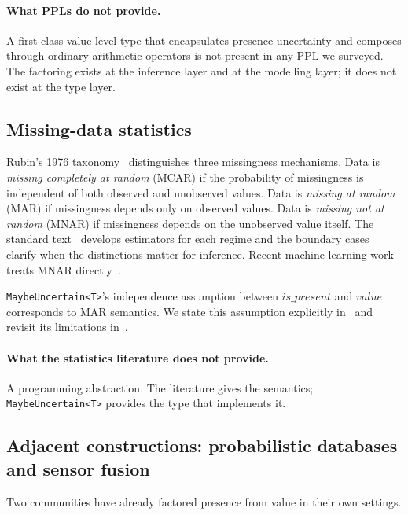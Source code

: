 \paragraph{What PPLs do not provide.} A first-class value-level type that
encapsulates presence-uncertainty and composes through ordinary arithmetic
operators is not present in any PPL we surveyed. The factoring exists at the
inference layer and at the modelling layer; it does not exist at the type
layer.

\subsection{Missing-data statistics}
\label{sec:bg:missingdata}

Rubin's 1976 taxonomy~\cite{rubin1976missing} distinguishes three
missingness mechanisms. Data is \emph{missing completely at random} (MCAR) if
the probability of missingness is independent of both observed and unobserved
values. Data is \emph{missing at random} (MAR) if missingness depends only on
observed values. Data is \emph{missing not at random} (MNAR) if missingness
depends on the unobserved value itself. The standard
text~\cite{littlerubin2019} develops estimators for each regime and the
boundary cases~\cite{mealli2015mar,seaman2013mar} clarify when the
distinctions matter for inference. Recent machine-learning work treats MNAR
directly~\cite{ipsen2021notmiwae}.

\texttt{MaybeUncertain<T>}'s independence assumption between $\mathit{is\_present}$
and $\mathit{value}$ corresponds to MAR semantics. We state this assumption
explicitly in~ and revisit its limitations in~.

\paragraph{What the statistics literature does not provide.} A programming
abstraction. The literature gives the semantics; \texttt{MaybeUncertain<T>}
provides the type that implements it.

\subsection{Adjacent constructions: probabilistic databases and sensor fusion}
\label{sec:bg:adjacent}

Two communities have already factored presence from value in their own
settings.

